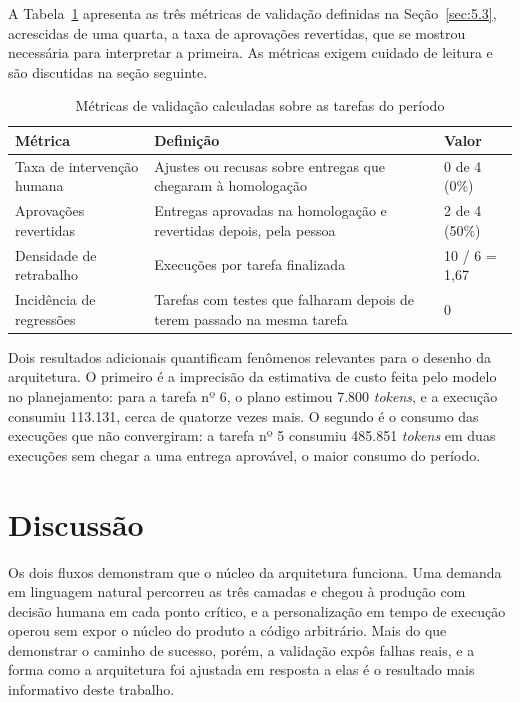 A Tabela~\ref{tab:2} apresenta as três métricas de validação definidas na Seção~\ref{sec:5.3}, acrescidas de uma quarta, a taxa de aprovações revertidas, que se mostrou necessária para interpretar a primeira. As métricas exigem cuidado de leitura e são discutidas na seção seguinte.

\begin{table}[htb]
\centering
\caption{Métricas de validação calculadas sobre as tarefas do período}
\label{tab:2}
\footnotesize
\renewcommand{\arraystretch}{1.25}
\begin{tabularx}{\textwidth}{|X|X|X|}
\hline
\textbf{Métrica} & \textbf{Definição} & \textbf{Valor} \\
\hline
Taxa de intervenção humana & Ajustes ou recusas sobre entregas que chegaram à homologação & 0 de 4 (0\%) \\
\hline
Aprovações revertidas & Entregas aprovadas na homologação e revertidas depois, pela pessoa & 2 de 4 (50\%) \\
\hline
Densidade de retrabalho & Execuções por tarefa finalizada & 10 / 6 = 1,67 \\
\hline
Incidência de regressões & Tarefas com testes que falharam depois de terem passado na mesma tarefa & 0 \\
\hline
\end{tabularx}
\end{table}

Dois resultados adicionais quantificam fenômenos relevantes para o desenho da arquitetura. O primeiro é a imprecisão da estimativa de custo feita pelo modelo no planejamento: para a tarefa nº 6, o plano estimou 7.800 \textit{tokens}, e a execução consumiu 113.131, cerca de quatorze vezes mais. O segundo é o consumo das execuções que não convergiram: a tarefa nº 5 consumiu 485.851 \textit{tokens} em duas execuções sem chegar a uma entrega aprovável, o maior consumo do período.

\section{Discussão}\label{sec:5.7}

Os dois fluxos demonstram que o núcleo da arquitetura funciona. Uma demanda em linguagem natural percorreu as três camadas e chegou à produção com decisão humana em cada ponto crítico, e a personalização em tempo de execução operou sem expor o núcleo do produto a código arbitrário. Mais do que demonstrar o caminho de sucesso, porém, a validação expôs falhas reais, e a forma como a arquitetura foi ajustada em resposta a elas é o resultado mais informativo deste trabalho.

